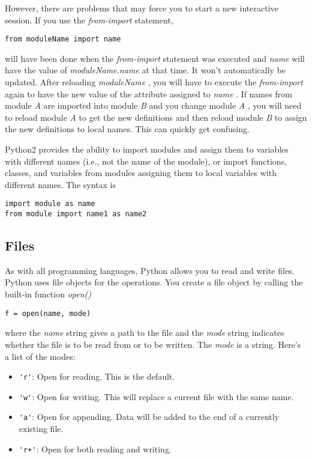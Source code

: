 However, there are problems that
may force you to start a new interactive session. If you use the
\emph{from-import} statement,

\begin{verbatim}
from moduleName import name
\end{verbatim}


will have been done when the \emph{from-import} statement was executed
and \emph{name} will have the value of \emph{moduleName.name} at that
time. It won't automatically be updated. After reloading
\emph{moduleName} , you will have to execute the \emph{from-import}
again to have the new value of the attribute assigned to \emph{name} .
If names from module \emph{A} are imported into module \emph{B} and you
change module \emph{A} , you will need to reload module \emph{A} to get
the new definitions and then reload module \emph{B} to assign the new
definitions to local names. This can quickly get confusing.

Python2 provides the ability to
import modules and assign them to variables with different names (i.e.,
not the name of the module), or import functions, classes, and variables
from modules assigning them to local variables with different names. The
syntax is

\begin{verbatim}
import module as name
from module import name1 as name2
\end{verbatim}

\subsection{Files}

As with all programming languages,
Python allows you to read and write files. Python uses file objects for
the operations. You create a file object by calling the built-in
function \emph{open()}

\begin{verbatim}
f = open(name, mode)
\end{verbatim}

where the \emph{name} string gives
a path to the file and the \emph{mode} string indicates whether the file
is to be read from or to be written. The \emph{mode} is a string. Here's
a list of the modes:

\begin{itemize}

\item
  \verb"'r'": Open for reading.  This is the default.
\item
  \verb"'w'": Open for writing.
  This will replace a current file with the same name.
\item
  \verb"'a'": Open for appending.
  Data will be added to the end of a currently existing file.
\item
  \verb"'r+'": Open for both reading and writing.
\end{itemize}


